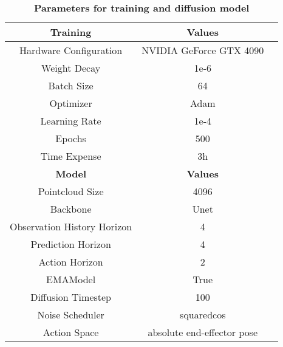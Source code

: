 \begin{table}[tb]
\begin{center}
\caption{
   \textbf{Parameters for training and diffusion model}
   }
\label{tab:hyper}
{
\begin{tabular}{c|cc}

\hline
 \textbf{Training} & \textbf{Values}\\ 
\hline
 Hardware Configuration & NVIDIA GeForce GTX 4090 \\
Weight Decay & 1e-6 \\
Batch Size & 64 \\
Optimizer & Adam  \\
Learning Rate & 1e-4  \\
Epochs & 500 \\
Time Expense & 3h\\
\hline
 \textbf{Model} & \textbf{Values}\\ 
\hline
Pointcloud Size & 4096 \\
Backbone & Unet \\
Observation History Horizon & 4 \\
Prediction Horizon & 4 \\
Action Horizon & 2 \\
EMAModel & True \\
Diffusion Timestep & 100 \\
Noise Scheduler & squaredcos \\
Action Space & absolute end-effector pose \\
\hline
\end{tabular}
}
\end{center}
\end{table}